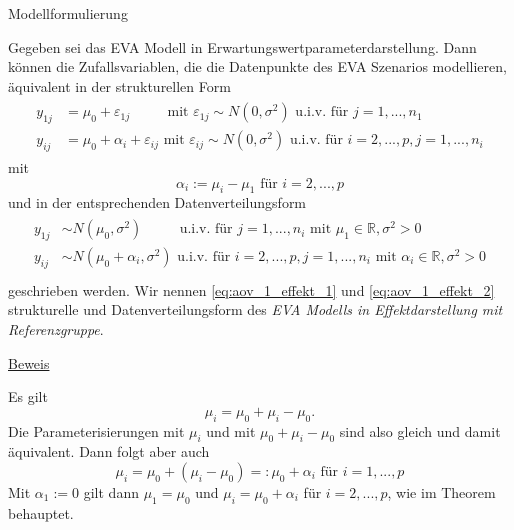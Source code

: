 \documentclass[
  8pt,
  ignorenonframetext,
]{beamer}
\begin{document}
\begin{frame}{Modellformulierung}
\protect\hypertarget{modellformulierung-3}{}
\footnotesize
{}
\begin{theorem}
\justifying
\normalfont
Gegeben sei das EVA Modell in Erwartungswertparameterdarstellung. Dann können die
Zufallsvariablen, die die Datenpunkte des EVA Szenarios modellieren, äquivalent in
der strukturellen Form
\begin{align}\label{eq:aov_1_effekt_1}
\begin{split}
y_{1j} & = \mu_0 + \varepsilon_{1j} \quad\quad\,\,  \mbox{ mit }  \varepsilon_{1j} \sim N(0,\sigma^2) \mbox{ u.i.v. für } j = 1,...,n_1              \\
y_{ij} & = \mu_0 + \alpha_i + \varepsilon_{ij}      \mbox{ mit } \varepsilon_{ij} \sim N(0,\sigma^2) \mbox{ u.i.v. für } i = 2,...,p, j = 1,...,n_i
\end{split}
\end{align}
mit
\begin{equation}
\alpha_i := \mu_i - \mu_1 \mbox{ für } i = 2,...,p
\end{equation}
und in der entsprechenden Datenverteilungsform
\begin{align}\label{eq:aov_1_effekt_2}
\begin{split}
y_{1j} & \sim N(\mu_0,\sigma^2)  \quad\quad\,\, \mbox{ u.i.v. für } j = 1,...,n_i \mbox{ mit } \mu_1 \in \mathbb{R}, \sigma^2 > 0 \\
y_{ij} & \sim N(\mu_0 + \alpha_i,\sigma^2)      \mbox{ u.i.v. für } i = 2,..., p, j = 1,...,n_i \mbox{ mit } \alpha_i \in \mathbb{R}, \sigma^2 > 0 \\
\end{split}
\end{align}
geschrieben werden. Wir nennen \eqref{eq:aov_1_effekt_1} und \eqref{eq:aov_1_effekt_2}
strukturelle und Datenverteilungsform des \textit{EVA Modells in Effektdarstellung
mit Referenzgruppe}.
\end{theorem}
\vspace{-2mm}
\footnotesize

\underline{Beweis}

Es gilt \begin{equation}
\mu_i = \mu_0 + \mu_i - \mu_0.
\end{equation} Die Parameterisierungen mit \(\mu_i\) und mit
\(\mu_0 + \mu_i - \mu_0\) sind also gleich und damit äquivalent. Dann
folgt aber auch \begin{equation}
\mu_i = \mu_0 + (\mu_i - \mu_0) =: \mu_0 + \alpha_i \mbox{ für } i = 1,...,p
\end{equation} Mit \(\alpha_1 := 0\) gilt dann \(\mu_1 = \mu_0\) und
\(\mu_i = \mu_0 + \alpha_i\) für \(i = 2,...,p\), wie im Theorem
behauptet.
\end{frame}
\end{document}
